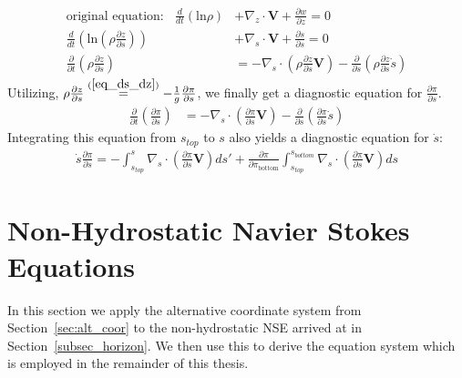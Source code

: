 \begin{align*}
\text{original equation:}~~~~ \frac{d}{dt}\left(\text{ln}\rho\right) &+ \nabla _z \cdot \textbf{V} + \frac{\partial w}{\partial z} = 0 \\
\frac{d}{dt}\left(\text{ln}\left(\rho\frac{\partial z}{\partial s}\right)\right) &+ \nabla _s \cdot \textbf{V} + \frac{\partial \dot{s}}{\partial s} = 0\\
\frac{\partial}{\partial t}\left(\rho\frac{\partial z}{\partial s}\right) &= - \nabla _s \cdot \left(\rho\frac{\partial z}{\partial s}\textbf{V}\right) - \frac{\partial }{\partial s}\left(\rho\frac{\partial z}{\partial s}\dot{s}\right)
\end{align*}
Utilizing, $\rho\frac{\partial z}{\partial s} \stackrel{(\ref{eq_ds_dz})}{=} - \frac{1}{g}\frac{\partial \pi}{\partial s}$, we finally get a diagnostic equation for $\frac{\partial \pi}{\partial s}$.
\begin{align*}
\frac{\partial}{\partial t}\left(\frac{\partial \pi}{\partial s}\right) &= - \nabla _s \cdot \left(\frac{\partial \pi}{\partial s}\textbf{V}\right) - \frac{\partial }{\partial s}\left(\frac{\partial \pi}{\partial s}\dot{s}\right)
\end{align*}
Integrating this equation from $s_{top}$ to $s$ also yields a diagnostic equation for $\dot{s}$:
\begin{align*}
\dot{s}\frac{\partial \pi}{\partial s} = -\int _{s_{top}}^s\nabla _s \cdot \left(\frac{\partial \pi}{\partial s}\textbf{V}\right)ds' + \frac{\partial \pi}{\partial \pi_{\text{bottom}}} \int  _{s_{top}}^{s_{bottom}} \nabla _s \cdot \left(\frac{\partial \pi}{\partial s}\textbf{V}\right) ds
\end{align*}


\section{Non-Hydrostatic Navier Stokes Equations}\label{sec:non_hydrostatic}
In this section we apply the alternative coordinate system from Section~\ref{sec:alt_coor} to the non-hydrostatic NSE arrived at in Section~\ref{subsec_horizon}.
We then use this to derive the equation system which is employed in the remainder of this thesis.
\\


